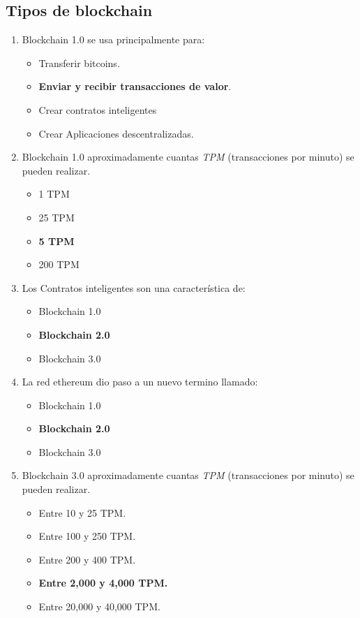 \documentclass[a4paper,12pt]{/home/armando/Documentos/Cursos/LaTeX/Plantillas/lib/pub}
\begin{document}
\subsection{Tipos de blockchain}
\begin{enumerate}
	\item Blockchain 1.0 se usa principalmente para:
	\begin{itemize}
		\item Transferir bitcoins.
		\item \textbf{Enviar y recibir transacciones de valor}.
		\item Crear contratos inteligentes
		\item Crear Aplicaciones descentralizadas.
	\end{itemize}
	\item Blockchain 1.0 aproximadamente cuantas \textit{TPM} (transacciones por minuto) se pueden realizar.
	\begin{itemize}
		\item 1 TPM
		\item 25 TPM
		\item \textbf{5 TPM}
		\item 200 TPM
	\end{itemize}
	\item Los Contratos inteligentes son una característica de:
	\begin{itemize}
		\item Blockchain 1.0
		\item \textbf{Blockchain 2.0}
		\item Blockchain 3.0
	\end{itemize}
	\item La red ethereum dio paso a un nuevo termino llamado:
	\begin{itemize}
		\item Blockchain 1.0
		\item \textbf{Blockchain 2.0}
		\item Blockchain 3.0
	\end{itemize}
	\item Blockchain 3.0 aproximadamente cuantas \textit{TPM} (transacciones por minuto) se pueden realizar.
	\begin{itemize}
		\item Entre 10 y 25 TPM.
		\item Entre 100 y 250 TPM.
		\item Entre 200 y 400 TPM.
		\item \textbf{Entre 2,000 y 4,000 TPM.}
		\item Entre 20,000 y 40,000 TPM.
	\end{itemize}
\end{enumerate}
\end{document}
